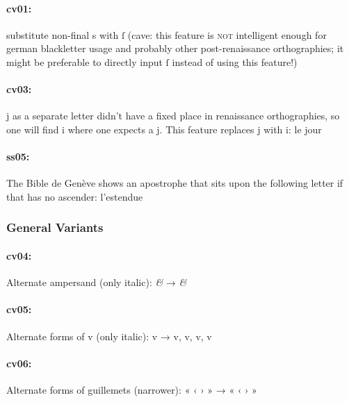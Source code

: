 \documentclass[pagesize,DIV14]{scrartcl}
\begin{document}
\paragraph*{cv01:} {substitute non-final s with ſ (cave: this feature is \textsc{not} intelligent enough for german blackletter usage and probably other post-renaissance orthographies; it might be preferable to directly input ſ instead of using this feature!)}
\paragraph*{cv03:} j as a separate letter didn’t have a fixed place  in renaissance orthographies, so one will find i where one expects a j. This feature replaces j with i: {le jour}
\paragraph*{ss05:} The Bible de Genève shows an apostrophe that sits upon the following letter if that has no ascender: {l’estendue}

\subsubsection{General Variants}

\paragraph*{cv04:} Alternate ampersand (only italic): \textit{\&} → \textit{\&}

\paragraph*{cv05:} Alternate forms of v (only italic): 
{ v →
 v,
 v,
 v,
 v}

\paragraph*{cv06:} Alternate forms of guillemets (narrower): {« ‹ › »} → {« ‹ › »}
\end{document}
